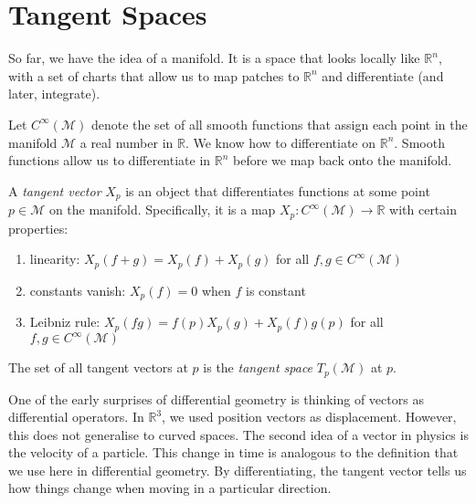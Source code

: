 
\section{Tangent Spaces}%
\label{sec:tangent_spaces}

So far, we have the idea of a manifold. It is a space that looks locally like $\mathbb{R}^n$, with a set of charts that allow us to map patches to $\mathbb{R}^n$ and differentiate (and later, integrate).

Let $C^{\infty}(\mathcal{M})$ denote the set of all smooth functions that assign each point in the manifold $\mathcal{M}$ a real number in $\mathbb{R}$. We know how to differentiate on $\mathbb{R}^n$. Smooth functions allow us to differentiate in $\mathbb{R}^n$ before we map back onto the manifold.

\begin{definition}
  A \emph{tangent vector} $X_p$ is an object that differentiates functions at some point $p \in \mathcal{M}$ on the manifold.
  Specifically, it is a map $X_p: C^{\infty} (\mathcal{M}) \to \mathbb{R}$ with certain properties:
  \begin{enumerate}
    \item linearity: $X_p(f + g) = X_p(f) + X_p(g)$ for all $f, g \in C^{\infty} (\mathcal{M})$
    \item constants vanish: $X_p(f) = 0$ when $f$ is constant
    \item Leibniz rule: $X_p(fg) = f(p) X_p(g) + X_p(f) g(p)$ for all $f, g \in C^\infty(\mathcal{M})$
  \end{enumerate}
\end{definition}

\begin{definition}
  The set of all tangent vectors at $p$ is the \emph{tangent space} $T_p(\mathcal{M})$ at $p$.
\end{definition}

One of the early surprises of differential geometry is thinking of vectors as differential operators.
In $\mathbb{R}^3$, we used position vectors as displacement. However, this does not generalise to curved spaces.
The second idea of a vector in physics is the velocity of a particle. This change in time is analogous to the definition that we use here in differential geometry.
By differentiating, the tangent vector tells us how things change when moving in a particular direction.

